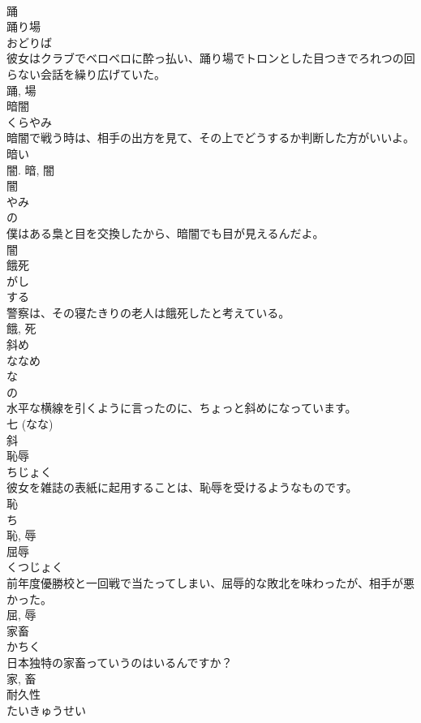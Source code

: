 \documentclass[8pt]{extreport}
\begin{document}
\begin{CJK}{UTF8}{min}
\\	踊	
\\	踊り場	
\\	おどりば	
\\	彼女はクラブでベロベロに酔っ払い、踊り場でトロンとした目つきでろれつの回らない会話を繰り広げていた。	
\\	踊, 場	
\\	暗闇	
\\	くらやみ	
\\	暗闇で戦う時は、相手の出方を見て、その上でどうするか判断した方がいいよ。	
\\	暗い 
\\	闇.	暗, 闇	
\\	闇	
\\	やみ	
\\	の 
\\	僕はある梟と目を交換したから、暗闇でも目が見えるんだよ。	
\\	闇	
\\	餓死	
\\	がし	
\\	する 
\\	警察は、その寝たきりの老人は餓死したと考えている。	
\\	餓, 死	
\\	斜め	
\\	ななめ	
\\	な 
\\	の 
\\	水平な横線を引くように言ったのに、ちょっと斜めになっています。	
\\	七 (なな) 
\\	斜	
\\	恥辱	
\\	ちじょく	
\\	彼女を雑誌の表紙に起用することは、恥辱を受けるようなものです。	
\\	恥 
\\	ち 
\\	恥, 辱	
\\	屈辱	
\\	くつじょく	
\\	前年度優勝校と一回戦で当たってしまい、屈辱的な敗北を味わったが、相手が悪かった。	
\\	屈, 辱	
\\	家畜	
\\	かちく	
\\	日本独特の家畜っていうのはいるんですか？	
\\	家, 畜	
\\	耐久性	
\\	たいきゅうせい	

\end{CJK}
\end{document}
